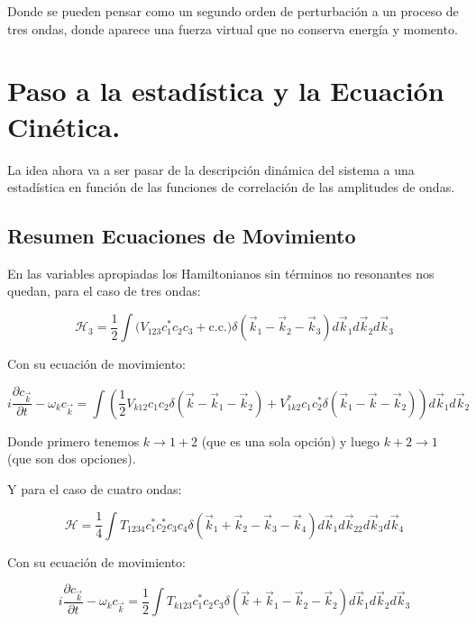 Donde se pueden pensar como un segundo orden de perturbación a un proceso de tres ondas, donde aparece una fuerza virtual que no conserva energía y momento. 

\section{Paso a la estadística y la Ecuación Cinética.}
La idea ahora va a ser pasar de la descripción dinámica del sistema a una estadística en función de las funciones de correlación de las amplitudes de ondas.

\subsection*{Resumen Ecuaciones de Movimiento}
En las variables apropiadas los Hamiltonianos sin términos no resonantes nos quedan, para el caso de tres ondas: 


\begin{equation}
	\mathcal{H}_3 = \frac{1}{2}\int \big(V_{123}c_1^*c_2c_3 + \text{c.c.}\big)\delta(\vec k_1-\vec k_2-\vec k_3)d\vec k_1 d\vec k_2 d\vec k_3
\end{equation}

Con su ecuación de movimiento:

\begin{equation}
	i\frac{\partial c_{\vec k}}{\partial t} - \omega_k c_{\vec k} = \int \left(\frac{1}{2}V_{k12}c_1c_2\delta(\vec k - \vec k_1 -\vec k_2) + V^*_{1k2}c_1c_2^*\delta(\vec k_1 -\vec k-\vec k_2)\right)d\vec k_1d\vec k_2
	\label{eq:motion_equation_three_waves}
\end{equation}

Donde primero tenemos $k\rightarrow1+2$ (que es una sola opción) y luego $k+2\rightarrow1$ (que son dos opciones).

Y para el caso de cuatro ondas:

\begin{equation}
	\mathcal{H} = \frac{1}{4}\int T_{1234}c_1^*c_2^*c_3c_4\delta(\vec k_1+\vec k_2-\vec k_3-\vec k_4)d\vec k_1 d\vec k_22 d\vec k_3 d\vec k_4
\end{equation}

Con su ecuación de movimiento:

\begin{equation}
	i\frac{\partial c_{\vec k}}{\partial t} - \omega_k c_{\vec k} = \frac{1}{2} \int T_{k123}c_1^*c_2c_3\delta(\vec k+\vec k_1-\vec k_2-\vec k_2) d\vec k_1 d\vec k_2d\vec k_3
\end{equation}

